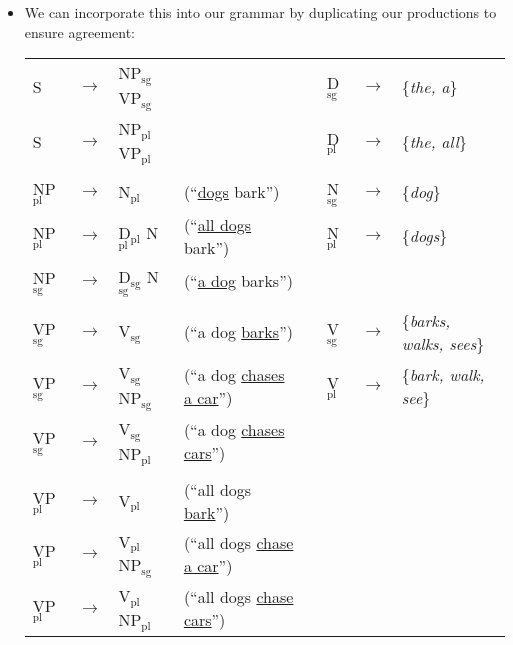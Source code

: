 \documentclass[11pt,letterpaper]{article}
\newcommand{\ra}{\rightarrow}
\begin{document}
\begin{itemize}
  \item We can incorporate this into our grammar by duplicating our productions to ensure agreement:
	\begin{center}
	\begin{tabular}{llll p{8mm} lll}
	  S & $\ra$ & NP$_{\text{sg}}$ VP$_{\text{sg}}$                &                                         && D$_{\text{sg}}$ & $\ra$ & \{\textit{the, a}\}      \\
	  S & $\ra$ & NP$_{\text{pl}}$ VP$_{\text{pl}}$                &                                         && D$_{\text{pl}}$ & $\ra$ & \{\textit{the, all}\}    \\
	  \\
	  NP$_{\text{pl}}$ & $\ra$ & N$_{\text{pl}}$                   & (``\underline{dogs} bark'')             && N$_{\text{sg}}$ & $\ra$ & \{\textit{dog}\}    \\
	  NP$_{\text{pl}}$ & $\ra$ & D$_{\text{pl}}$ N$_{\text{pl}}$   & (``\underline{all dogs} bark'')         && N$_{\text{pl}}$ & $\ra$ & \{\textit{dogs}\}    \\
	  NP$_{\text{sg}}$ & $\ra$ & D$_{\text{sg}}$ N$_{\text{sg}}$   & (``\underline{a dog} barks'')    \\
	  \\
	  VP$_{\text{sg}}$ & $\ra$ & V$_{\text{sg}}$                   & (``a dog \underline{barks}'')           && V$_{\text{sg}}$ & $\ra$ & \{\textit{barks, walks, sees}\} \\
	  VP$_{\text{sg}}$ & $\ra$ & V$_{\text{sg}}$ NP$_{\text{sg}}$  & (``a dog \underline{chases a car}'')    && V$_{\text{pl}}$ & $\ra$ & \{\textit{bark, walk, see}\} \\
	  VP$_{\text{sg}}$ & $\ra$ & V$_{\text{sg}}$ NP$_{\text{pl}}$  & (``a dog \underline{chases cars}'')     && \\
	  \\
	  VP$_{\text{pl}}$ & $\ra$ & V$_{\text{pl}}$                   & (``all dogs \underline{bark}'')         && \\
	  VP$_{\text{pl}}$ & $\ra$ & V$_{\text{pl}}$ NP$_{\text{sg}}$  & (``all dogs \underline{chase a car}'')  && \\
	  VP$_{\text{pl}}$ & $\ra$ & V$_{\text{pl}}$ NP$_{\text{pl}}$  & (``all dogs \underline{chase cars}'')   &&
	\end{tabular}
	\end{center}


\end{itemize}
\end{document}
